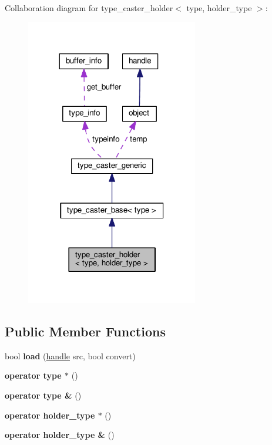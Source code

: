 Collaboration diagram for type\+\_\+caster\+\_\+holder$<$ type, holder\+\_\+type $>$\+:
\nopagebreak
\begin{figure}[H]
\begin{center}
\leavevmode
\includegraphics[width=213pt]{classtype__caster__holder__coll__graph}
\end{center}
\end{figure}
\subsection*{Public Member Functions}
\begin{DoxyCompactItemize}
\item 
bool {\bfseries load} (\hyperlink{classhandle}{handle} src, bool convert)\hypertarget{classtype__caster__holder_a6345f3139ddbc0b78b483a0813549bde}{}\label{classtype__caster__holder_a6345f3139ddbc0b78b483a0813549bde}

\item 
{\bfseries operator type $\ast$} ()\hypertarget{classtype__caster__holder_a89e7a89f272b0f68f9cbc8a51908db3e}{}\label{classtype__caster__holder_a89e7a89f272b0f68f9cbc8a51908db3e}

\item 
{\bfseries operator type \&} ()\hypertarget{classtype__caster__holder_a42a05296202279a448088b08c7cd5f6e}{}\label{classtype__caster__holder_a42a05296202279a448088b08c7cd5f6e}

\item 
{\bfseries operator holder\+\_\+type $\ast$} ()\hypertarget{classtype__caster__holder_a07ff28f45127c97f47a4fd5b842a396a}{}\label{classtype__caster__holder_a07ff28f45127c97f47a4fd5b842a396a}

\item 
{\bfseries operator holder\+\_\+type \&} ()\hypertarget{classtype__caster__holder_ab76458fefec0b3290cd9db5e2b4da0ec}{}\label{classtype__caster__holder_ab76458fefec0b3290cd9db5e2b4da0ec}

\end{DoxyCompactItemize}
